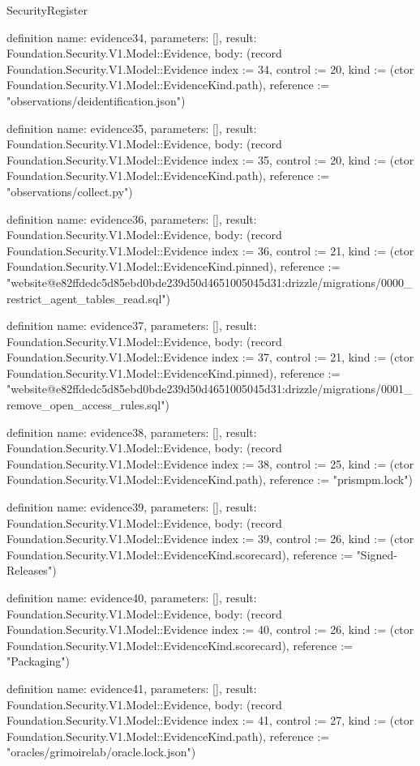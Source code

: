 \begin{lexlean}{SecurityRegister}
\begin{semanticmodule}
definition{
  name: evidence34,
  parameters: [],
  result: Foundation.Security.V1.Model::Evidence,
  body: (record Foundation.Security.V1.Model::Evidence {index := 34, control := 20, kind := (ctor Foundation.Security.V1.Model::EvidenceKind.path), reference := "observations/deidentification.json"})
}

definition{
  name: evidence35,
  parameters: [],
  result: Foundation.Security.V1.Model::Evidence,
  body: (record Foundation.Security.V1.Model::Evidence {index := 35, control := 20, kind := (ctor Foundation.Security.V1.Model::EvidenceKind.path), reference := "observations/collect.py"})
}

definition{
  name: evidence36,
  parameters: [],
  result: Foundation.Security.V1.Model::Evidence,
  body: (record Foundation.Security.V1.Model::Evidence {index := 36, control := 21, kind := (ctor Foundation.Security.V1.Model::EvidenceKind.pinned), reference := "website@e82ffdedc5d85ebd0bde239d50d4651005045d31:drizzle/migrations/0000_restrict_agent_tables_read.sql"})
}

definition{
  name: evidence37,
  parameters: [],
  result: Foundation.Security.V1.Model::Evidence,
  body: (record Foundation.Security.V1.Model::Evidence {index := 37, control := 21, kind := (ctor Foundation.Security.V1.Model::EvidenceKind.pinned), reference := "website@e82ffdedc5d85ebd0bde239d50d4651005045d31:drizzle/migrations/0001_remove_open_access_rules.sql"})
}

definition{
  name: evidence38,
  parameters: [],
  result: Foundation.Security.V1.Model::Evidence,
  body: (record Foundation.Security.V1.Model::Evidence {index := 38, control := 25, kind := (ctor Foundation.Security.V1.Model::EvidenceKind.path), reference := "prismpm.lock"})
}

definition{
  name: evidence39,
  parameters: [],
  result: Foundation.Security.V1.Model::Evidence,
  body: (record Foundation.Security.V1.Model::Evidence {index := 39, control := 26, kind := (ctor Foundation.Security.V1.Model::EvidenceKind.scorecard), reference := "Signed-Releases"})
}

definition{
  name: evidence40,
  parameters: [],
  result: Foundation.Security.V1.Model::Evidence,
  body: (record Foundation.Security.V1.Model::Evidence {index := 40, control := 26, kind := (ctor Foundation.Security.V1.Model::EvidenceKind.scorecard), reference := "Packaging"})
}

definition{
  name: evidence41,
  parameters: [],
  result: Foundation.Security.V1.Model::Evidence,
  body: (record Foundation.Security.V1.Model::Evidence {index := 41, control := 27, kind := (ctor Foundation.Security.V1.Model::EvidenceKind.path), reference := "oracles/grimoirelab/oracle.lock.json"})
}


\end{semanticmodule}
\end{lexlean}
